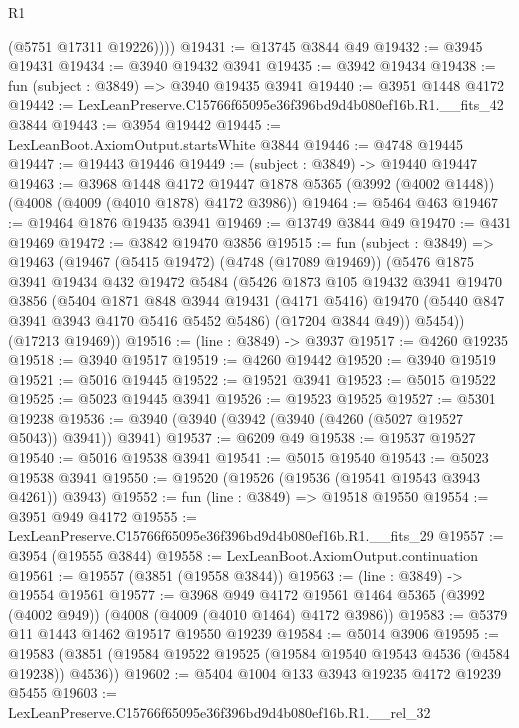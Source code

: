 \begin{lexlean}{R1}
\begin{coremodule}
          (@5751 @17311 @19226))))
@19431 := @13745 @3844 @49
@19432 := @3945 @19431
@19434 := @3940 @19432 @3941
@19435 := @3942 @19434
@19438 := fun (subject : @3849) => @3940 @19435 @3941
@19440 := @3951 @1448 @4172
@19442 := LexLeanPreserve.C15766f65095e36f396bd9d4b080ef16b.R1.__fits_42 @3844
@19443 := @3954 @19442
@19445 := LexLeanBoot.AxiomOutput.startsWhite @3844
@19446 := @4748 @19445
@19447 := @19443 @19446
@19449 := (subject : @3849) -> @19440 @19447
@19463 := @3968
    @1448
    @4172
    @19447
    @1878
    @5365
    (@3992 (@4002 @1448))
    (@4008 (@4009 (@4010 @1878) @4172 @3986))
@19464 := @5464 @463
@19467 := @19464 @1876 @19435 @3941
@19469 := @13749 @3844 @49
@19470 := @431 @19469
@19472 := @3842 @19470 @3856
@19515 := fun (subject : @3849) =>
  @19463
    (@19467
      (@5415 @19472)
      (@4748 (@17089 @19469))
      (@5476
        @1875
        @3941
        @19434
        @432
        @19472
        @5484
        (@5426
          @1873
          @105
          @19432
          @3941
          @19470
          @3856
          (@5404
            @1871
            @848
            @3944
            @19431
            (@4171 @5416)
            @19470
            (@5440 @847 @3941 @3943 @4170 @5416 @5452 @5486)
            (@17204 @3844 @49))
          @5454))
      (@17213 @19469))
@19516 := (line : @3849) -> @3937
@19517 := @4260 @19235
@19518 := @3940 @19517
@19519 := @4260 @19442
@19520 := @3940 @19519
@19521 := @5016 @19445
@19522 := @19521 @3941
@19523 := @5015 @19522
@19525 := @5023 @19445 @3941
@19526 := @19523 @19525
@19527 := @5301 @19238
@19536 := @3940 (@3940 (@3942 (@3940 (@4260 (@5027 @19527 @5043)) @3941)) @3941)
@19537 := @6209 @49
@19538 := @19537 @19527
@19540 := @5016 @19538 @3941
@19541 := @5015 @19540
@19543 := @5023 @19538 @3941
@19550 := @19520 (@19526 (@19536 (@19541 @19543 @3943 @4261)) @3943)
@19552 := fun (line : @3849) => @19518 @19550
@19554 := @3951 @949 @4172
@19555 := LexLeanPreserve.C15766f65095e36f396bd9d4b080ef16b.R1.__fits_29
@19557 := @3954 (@19555 @3844)
@19558 := LexLeanBoot.AxiomOutput.continuation
@19561 := @19557 (@3851 (@19558 @3844))
@19563 := (line : @3849) -> @19554 @19561
@19577 := @3968
    @949
    @4172
    @19561
    @1464
    @5365
    (@3992 (@4002 @949))
    (@4008 (@4009 (@4010 @1464) @4172 @3986))
@19583 := @5379 @11 @1443 @1462 @19517 @19550 @19239
@19584 := @5014 @3906
@19595 := @19583 (@3851 (@19584 @19522 @19525 (@19584 @19540 @19543 @4536 (@4584 @19238)) @4536))
@19602 := @5404 @1004 @133 @3943 @19235 @4172 @19239 @5455
@19603 := LexLeanPreserve.C15766f65095e36f396bd9d4b080ef16b.R1.__rel_32

\end{coremodule}
\end{lexlean}
